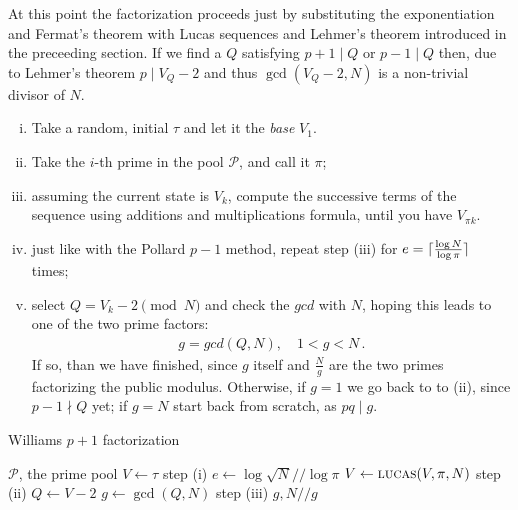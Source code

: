 At this point the factorization proceeds just by substituting the
exponentiation and Fermat's theorem with Lucas sequences and Lehmer's theorem
introduced in the preceeding section. If we find a $Q$ satisfying $p+1 \mid Q
\text{ or } p-1 \mid Q$ then, due to Lehmer's theorem $p \mid V_Q -2$ and thus
$\gcd(V_Q -2, N)$ is a non-trivial divisor of $N$.

\begin{enumerate}[(i)]
\item Take a random, initial $\tau$ and let it the \emph{base} $V_1$.
\item Take the $i$-th prime in the pool $\mathcal{P}$, and call it $\pi$;
\item assuming the current state is $V_k$, compute the
  successive terms of the sequence using additions and multiplications formula,
  until you have $V_{\pi k}$.
\item just like with the Pollard $p-1$ method, repeat step (iii) for $e =
  \lceil\frac{\log N}{\log \pi}\rceil$ times;
\item select $Q = V_k - 2 \pmod{N}$ and check the $gcd$ with $N$, hoping this
  leads to one of the two prime factors:
\begin{align}
  g = gcd(Q, N), \quad 1 < g < N \,.
\end{align}
If so, than we have finished, since $g$ itself and $\frac{N}{g}$
are the two primes factorizing the public  modulus.
Otherwise, if $g = 1$ we go back to to (ii), since $p-1 \nmid Q$ yet;
if $g = N$ start back from scratch, as $pq \mid g$.

\end{enumerate}



\begin{algorithm}
  \caption{Williams $p+1$ factorization}
  \begin{algorithmic}[1]
    \Require $\mathcal{P}$, the prime pool
      \State $V \gets \tau$
      \Comment step (i)
        \State $e \gets \log \sqrt{N} // \log \pi$
          \State $V \gets \textsc{lucas}(V, \pi, N)$
          \Comment step (ii)
          \State $Q \gets V -2$
          \State $g \gets \gcd(Q, N)$
          \Comment step (iii)
           \Return {}
           \Return $g, N//g$
          \EndIf
        \EndFor
      \EndFor
    \EndFunction
  \end{algorithmic}
\end{algorithm}
